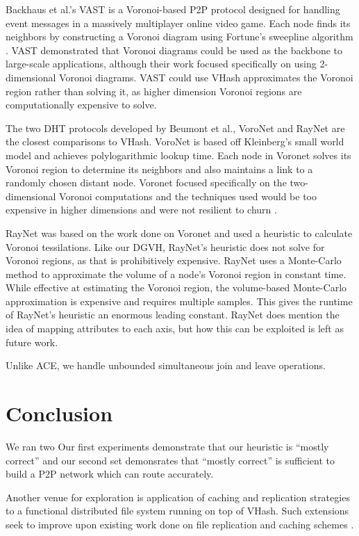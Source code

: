 \documentclass[11pt, conference, letterpaper]{IEEEtran}
\begin{document}
Backhaus et al.'s  VAST \cite{Backhaus:2007:VAS:1326257.1326266} is a Voronoi-based P2P protocol designed for handling event messages in a massively multiplayer online video game.  
Each node finds its neighbors by constructing a Voronoi diagram using Fortune's sweepline algorithm \cite{fortune1987sweepline}.  
VAST demonstrated that Voronoi diagrams could be used as the backbone to large-scale applications, although their work focused specifically on using 2-dimensional Voronoi diagrams.
VAST could use   
VHash approximates the Voronoi region rather than solving it, as higher dimension Voronoi regions are computationally expensive to solve.

The two DHT protocols developed by Beumont et al., VoroNet \cite{voronet} and RayNet \cite{raynet} are the closest comparisons to VHash.
VoroNet is based off Kleinberg's small world model \cite{kleinberg2000navigation} and achieves polylogarithmic lookup time.  
Each node in Voronet solves its Voronoi region to determine its neighbors and also maintains a link to a randomly chosen distant node.
Voronet focused specifically on the two-dimensional Voronoi computations and the techniques used would be too expensive in higher dimensions and were not resilient to churn  \cite{raynet}.

RayNet \cite{raynet} was based on the work done on Voronet and used a heuristic to calculate Voronoi tessilations.  
Like our DGVH, RayNet's heuristic does not solve for Voronoi regions, as that is prohibitively expensive.  
RayNet uses a Monte-Carlo method to approximate the volume of a node's Voronoi region in constant time.  
While effective at estimating the Voronoi region,  the volume-based Monte-Carlo approximation is expensive and requires multiple samples. 
This gives the runtime of RayNet's heuristic an enormous leading constant.
RayNet does mention the idea of mapping attributes to each axis, but how this can be exploited is left as future work.




Unlike ACE, we handle unbounded simultaneous join and leave operations.



\section{Conclusion}
\label{sec:conclusion}


We ran two 
Our first experiments demonstrate that our heuristic is ``mostly correct'' and our second set demonsrates that ``mostly correct'' is sufficient to build a P2P network which can route accurately.



Another venue for exploration is application of caching and replication strategies to a functional distributed file system running on top of VHash.  Such extensions seek to improve upon existing work done on file replication and caching schemes \cite{shen2010irm}.







\end{document}
